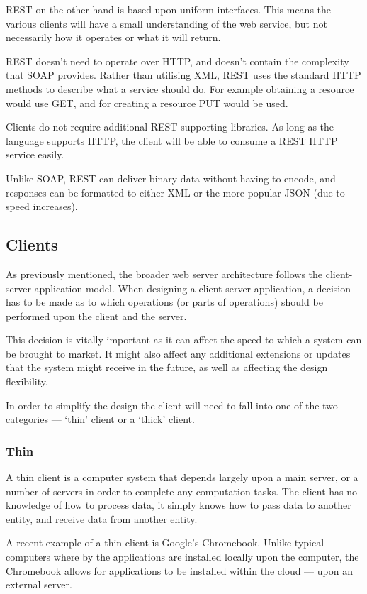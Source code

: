 REST on the other hand is based upon uniform interfaces. This means the various
clients will have a small understanding of the web service, but not necessarily
how it operates or what it will return.

REST doesn't need to operate over HTTP, and doesn't contain the complexity that
SOAP provides. Rather than utilising XML, REST uses the standard HTTP methods
to describe what a service should do. For example obtaining a resource would
use GET, and for creating a resource PUT would be used.

Clients do not require additional REST supporting libraries. As long as the
language supports HTTP, the client will be able to consume a REST HTTP service
easily.

Unlike SOAP, REST can deliver binary data without having to encode, and
responses can be formatted to either XML or the more popular JSON (due to speed
increases). 


\subsection{Clients}
As previously mentioned, the broader web server architecture follows the 
client-server application model. When designing a client-server application, a
decision has to be made as to which operations (or parts of operations) should
be performed upon the client and the server.

This decision is vitally important as it can affect the speed to which a system
can be brought to market. It might also affect any additional extensions or
updates that the system might receive in the future, as well as affecting the
design flexibility.

In order to simplify the design the client will need to fall into one of the
two categories --- `thin' client or a `thick' client. 


\subsubsection{Thin}
A thin client is a computer system that depends largely upon a main server, or 
a number of servers in order to complete any computation tasks. The client has 
no knowledge of how to process data, it simply knows how to pass data to 
another entity, and receive data from another entity.

A recent example of a thin client is Google's Chromebook. Unlike typical 
computers where by the applications are installed locally upon the computer, 
the Chromebook allows for applications to be installed within the cloud --- 
upon an external server.

